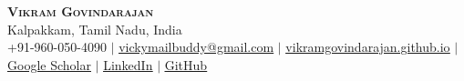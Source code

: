 \documentclass[letterpaper,11pt]{article}
\begin{document}

\begin{center}
	\textbf{\Huge \scshape Vikram Govindarajan} \\ \vspace{1pt}
	\small
	Kalpakkam, Tamil Nadu, India \\
	+91-960-050-4090 $|$
	\href{mailto:vickymailbuddy@gmail.com}{\underline{vickymailbuddy@gmail.com}} $|$
	\href{https://vikramgovindarajan.github.io/}{\underline{vikramgovindarajan.github.io}} $|$
	\href{https://scholar.google.com/citations?user=_uX7UfMAAAAJ}{\underline{Google Scholar}} $|$
	\href{https://www.linkedin.com/in/vikram-govindarajan-3205b027}{\underline{LinkedIn}} $|$
	\href{https://github.com/VikramGovindarajan}{\underline{GitHub}}

\end{center}

\end{document}
